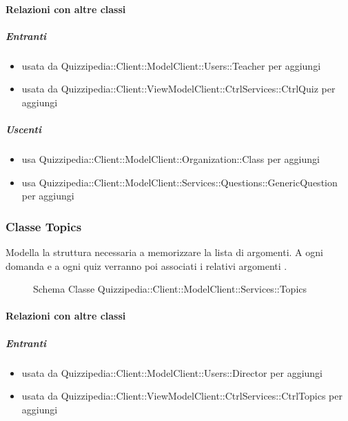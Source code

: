 \paragraph{Relazioni con altre classi}
\subparagraph{Entranti}
\begin{itemize}
\item usata da Quizzipedia::Client::ModelClient::Users::Teacher per aggiungi
\item usata da Quizzipedia::Client::ViewModelClient::CtrlServices::CtrlQuiz per aggiungi
\end{itemize}
\subparagraph{Uscenti}
\begin{itemize}
\item usa Quizzipedia::Client::ModelClient::Organization::Class per aggiungi
\item usa Quizzipedia::Client::ModelClient::Services::Questions::GenericQuestion per aggiungi
\end{itemize}
\subsubsection{Classe Topics}
Modella la struttura necessaria a memorizzare la lista di argomenti. A ogni domanda e a ogni quiz verranno poi associati i relativi argomenti .
\begin{figure}[H]
\centering
\noindent{}
\caption[Schema Classe Topics]{Schema Classe Quizzipedia::Client::ModelClient::Services::Topics}
\end{figure}
\paragraph{Relazioni con altre classi}
\subparagraph{Entranti}
\begin{itemize}
\item usata da Quizzipedia::Client::ModelClient::Users::Director per aggiungi
\item usata da Quizzipedia::Client::ViewModelClient::CtrlServices::CtrlTopics per aggiungi
\end{itemize}
